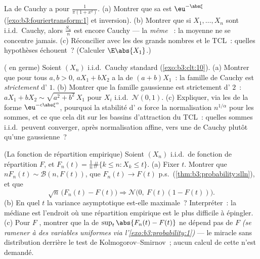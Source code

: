 \begin{exercise}[$\star\star$]\label{exo:b3:clt:10}
La  de Cauchy a pour  $\frac1{\pi(1 + x^2)}$.
(a) Montrer que sa  est
$\eu^{-\abs\xi}$ (\cref{exo:b3:fouriertransform:1} et
inversion).
(b) Montrer que si $X_1, \dots, X_n$ sont i.i.d.\ Cauchy,
alors $\frac{S_n}n$ est encore Cauchy --- la \emph{même}
~: la moyenne ne se concentre jamais.
(c) Réconcilier avec les  des grands nombres et le
TCL~: quelles hypothèses échouent~? (Calculer $\E\abs{X_1}$.)
\end{exercise}

\begin{exercise}[$\star\star$]\label{exo:b3:clt:11}
(  en germe) Soient $(X_n)$ i.i.d.\ Cauchy
standard (\cref{exo:b3:clt:10}).
(a) Montrer que pour tous $a, b > 0$, $aX_1 + bX_2$ a la
 de $(a + b)X_1$~: la famille de Cauchy est
\emph{strictement } d' $1$.
(b) Montrer que la famille gaussienne est strictement
 d' $2$~: $aX_1 + bX_2 \sim \sqrt{a^2 +
b^2}\,X_1$ pour $X_i$ i.i.d.\ $\mathcal N(0,1)$.
(c) Expliquer, via les  de la
forme $\eu^{-c\abs\xi^\alpha}$, pourquoi la stabilité
d' $\alpha$ force la normalisation $n^{1/\alpha}$
pour les sommes, et ce que cela dit sur les bassins
d'attraction du TCL~: quelles sommes i.i.d.\ peuvent
converger, après normalisation affine, vers une  de
Cauchy plutôt qu'une gaussienne~?
\end{exercise}

\begin{exercise}[$\star\star$]\label{exo:b3:clt:12}
(La fonction de répartition empirique) Soient $(X_n)$
i.i.d.\ de fonction de répartition $F$, et $F_n(t) =
\frac1n\#\{k \leq n : X_k \leq t\}$.
(a) Fixer $t$. Montrer que $n F_n(t) \sim \mathcal B(n,
F(t))$, que $F_n(t) \to F(t)$ p.s.\
(\cref{thm:b3:probability:slln}), et que
\[
\sqrt n\,\bigl(F_n(t) - F(t)\bigr) \Longrightarrow
\mathcal N\bigl(0,\ F(t)(1 - F(t))\bigr) .
\]
(b) En quel $t$ la variance asymptotique est-elle
maximale~? Interpréter~: la médiane est l'endroit où une
répartition empirique est le plus difficile à épingler.
(c) Pour $F$ , montrer que la  de
$\sup_t\abs{F_n(t) - F(t)}$ ne dépend pas de $F$
\emph{(se ramener à des variables uniformes via
l'\cref{exo:b3:probability:1})} --- le miracle sans
distribution derrière le test de Kolmogorov--Smirnov~; aucun
calcul de cette  n'est demandé.
\end{exercise}

